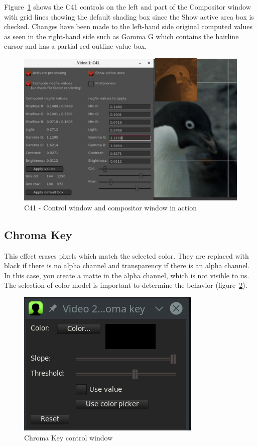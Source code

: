 Figure~\ref{fig:c41} shows the C41 controls on the left and part of the Compositor window with grid lines showing the default shading box since the Show active area box is checked. Changes have been made to the left-hand side original computed values as seen in the right-hand side such as Gamma G which contains the hairline cursor and has a partial red outline value box.

\begin{figure}[htpb]
    \centering
    \includegraphics[width=0.9\linewidth]{images/c41.png}
    \caption{C41 - Control window and compositor window in action}
    \label{fig:c41}
\end{figure}

\subsection{Chroma Key}%
\label{sub:chroma_key}

This effect erases pixels which match the selected color. They are replaced with black if there is no alpha channel and transparency if there is an alpha channel. In this case, you create a matte in the alpha channel, which is not visible to us. The selection of color model is important to determine the behavior (figure~\ref{fig:chroma-key}).

\begin{figure}[htpb]
    \centering
    \includegraphics[width=0.7\linewidth]{images/chroma-key.png}
    \caption{Chroma Key control window}
    \label{fig:chroma-key}
\end{figure}

